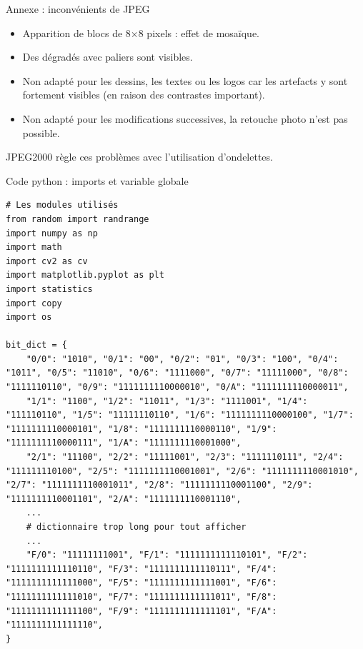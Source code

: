 \documentclass[xcolor=dvipsnames]{beamer}
\begin{document}
\begin{frame} {Annexe : inconvénients de JPEG}
    \footnotesize
    \begin{itemize}
        \item Apparition de blocs de 8×8 pixels : effet de mosaïque.
        \item Des dégradés avec paliers sont visibles.
        \item Non adapté pour les dessins, les textes ou les logos car les artefacts y sont fortement visibles (en raison des contrastes important).
        \item Non adapté pour les modifications successives, la retouche photo n'est pas possible. 
    \end{itemize}
    
    \vspace{1cm}

    JPEG2000 règle ces problèmes avec l'utilisation d'ondelettes.
\end{frame}


\begin{frame}[fragile]{Code python : imports et variable globale }
    \begin{lstlisting}[style=pythonStyle]
# Les modules utilisés
from random import randrange 
import numpy as np
import math
import cv2 as cv
import matplotlib.pyplot as plt
import statistics
import copy
import os

bit_dict = {
    "0/0": "1010", "0/1": "00", "0/2": "01", "0/3": "100", "0/4": "1011", "0/5": "11010", "0/6": "1111000", "0/7": "11111000", "0/8": "1111110110", "0/9": "1111111110000010", "0/A": "1111111110000011",
    "1/1": "1100", "1/2": "11011", "1/3": "1111001", "1/4": "111110110", "1/5": "11111110110", "1/6": "1111111110000100", "1/7": "1111111110000101", "1/8": "1111111110000110", "1/9": "1111111110000111", "1/A": "1111111110001000",
    "2/1": "11100", "2/2": "11111001", "2/3": "1111110111", "2/4": "111111110100", "2/5": "1111111110001001", "2/6": "1111111110001010", "2/7": "1111111110001011", "2/8": "1111111110001100", "2/9": "1111111110001101", "2/A": "1111111110001110",
    ...
    # dictionnaire trop long pour tout afficher
    ...
    "F/0": "11111111001", "F/1": "1111111111110101", "F/2": "1111111111110110", "F/3": "1111111111110111", "F/4": "1111111111111000", "F/5": "1111111111111001", "F/6": "1111111111111010", "F/7": "1111111111111011", "F/8": "1111111111111100", "F/9": "1111111111111101", "F/A": "1111111111111110",
}
    \end{lstlisting}
\end{frame}
\end{document}
